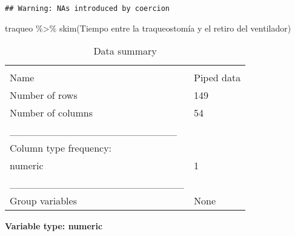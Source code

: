 \documentclass[
]{article}
\newenvironment{Shaded}{\begin{snugshade}}{\end{snugshade}}
\newcommand{\AttributeTok}[1]{\textcolor[rgb]{0.77,0.63,0.00}{#1}}
\newcommand{\DocumentationTok}[1]{\textcolor[rgb]{0.56,0.35,0.01}{\textbf{\textit{#1}}}}
\newcommand{\FunctionTok}[1]{\textcolor[rgb]{0.00,0.00,0.00}{#1}}
\newcommand{\NormalTok}[1]{#1}
\newcommand{\OtherTok}[1]{\textcolor[rgb]{0.56,0.35,0.01}{#1}}
\newcommand{\SpecialCharTok}[1]{\textcolor[rgb]{0.00,0.00,0.00}{#1}}
\newcommand{\StringTok}[1]{\textcolor[rgb]{0.31,0.60,0.02}{#1}}
\begin{document}
\begin{Shaded}
\end{Shaded}

\begin{verbatim}
## Warning: NAs introduced by coercion
\end{verbatim}

\begin{Shaded}
\begin{Highlighting}[]
\NormalTok{traqueo }\SpecialCharTok{\%\textgreater{}\%}
  \FunctionTok{skim}\NormalTok{(}\StringTok{\textasciigrave{}}\AttributeTok{Tiempo entre la traqueostomía y el retiro del ventilador}\StringTok{\textasciigrave{}}\NormalTok{)}
\end{Highlighting}
\end{Shaded}

\begin{longtable}[]{@{}ll@{}}
\caption{Data summary}\tabularnewline
\toprule
& \\
\midrule
\endfirsthead
\toprule
& \\
\midrule
\endhead
Name & Piped data \\
Number of rows & 149 \\
Number of columns & 54 \\
\_\_\_\_\_\_\_\_\_\_\_\_\_\_\_\_\_\_\_\_\_\_\_ & \\
Column type frequency: & \\
numeric & 1 \\
\_\_\_\_\_\_\_\_\_\_\_\_\_\_\_\_\_\_\_\_\_\_\_\_ & \\
Group variables & None \\
\bottomrule
\end{longtable}

\textbf{Variable type: numeric}
\end{document}
